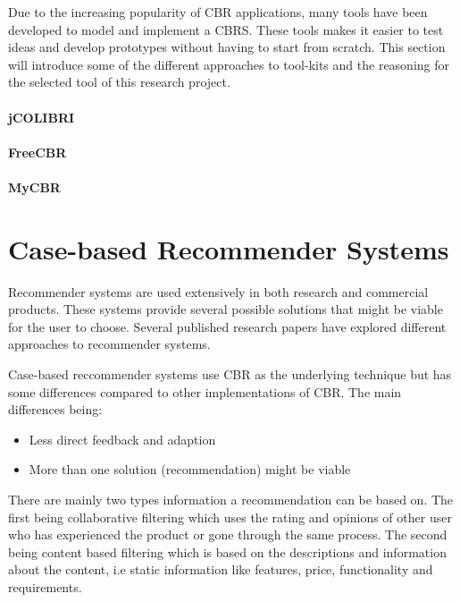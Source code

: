 Due to the increasing popularity of CBR applications\cite{kolodner2014case}, many tools have been developed to model and implement a CBRS. These tools makes it easier to test ideas and develop prototypes without having to start from scratch. This section will introduce some of the different approaches to tool-kits and the reasoning for the selected tool of this research project. 

\paragraph{jCOLIBRI}


\paragraph{FreeCBR}


\paragraph{MyCBR}


\section{Case-based Recommender Systems}
Recommender systems are used extensively in both research and commercial products. These systems provide several possible solutions that might be viable for the user to choose. Several published research papers have explored different approaches to recommender systems\cite{mulyana2015case}\cite{quijano2011happy}.

Case-based reccommender systems use CBR as the underlying technique but has some differences compared to other implementations of CBR. The main differences being:
 
\begin{itemize}
    \item Less direct feedback and adaption
    \item More than one solution (recommendation) might be viable
\end{itemize}

There are mainly two types information a recommendation can be based on. The first being collaborative filtering which uses the rating and opinions of other user who has experienced the product or gone through the same process. The second being content based filtering which is based on the descriptions and information about the content, i.e static information like features, price, functionality and requirements. 

